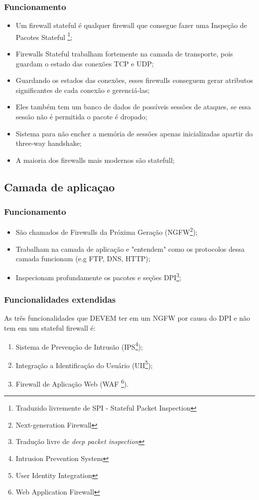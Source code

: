 \begin{frame}
	\frametitle{Funcionamento}
	\begin{itemize}
		\item Um firewall stateful é qualquer firewall que consegue fazer uma Inspeção de Pacotes Stateful \footnote{Traduzido livremente de SPI - Stateful Packet Inspection};
		\item Firewalls Stateful trabalham fortemente na camada de transporte, pois guardam o estado das conexões TCP e UDP;
		\item Guardando os estados das conexões, esses firewalls conseguem gerar atributos significantes de cada conexão e gerenciá-las;
		\item Eles também tem um banco de dados de possíveis sessões de ataques, se essa sessão não é permitida o pacote é dropado;
		\item Sistema para não encher a memória de sessões apenas inicializadas apartir do three-way handshake;
		\item A maioria dos firewalls mais modernos são statefull;
	\end{itemize}
\end{frame}


\subsection{Camada de aplicaçao}

\begin{frame}
	\frametitle{Funcionamento}
	\begin{itemize}
		\item São chamados de Firewalls da Próxima Geração (NGFW\footnote{Next-generation Firewall});
		\item Trabalham na camada de aplicação e "entendem" como os protocolos dessa camada funcionam (e.g FTP, DNS, HTTP);
		\item Inspecionam profundamente os pacotes e seções DPI\footnote{Tradução livre de \textit{deep packet inspection}};
	\end{itemize}
\end{frame}

\begin{frame}
	\frametitle{Funcionalidades extendidas}
	As três funcionalidades que DEVEM ter em um NGFW por causa do DPI e não tem em um stateful firewall é:
	\begin{enumerate}[i]
		\item Sistema de Prevenção de Intrusão (IPS\footnote{Intrusion Prevention System});
		\item Integração a Identificação do Usuário (UII\footnote{User Identity Integration});
		\item Firewall de Aplicação Web (WAF \footnote{Web Application Firewall}).
	\end{enumerate}
\end{frame}
